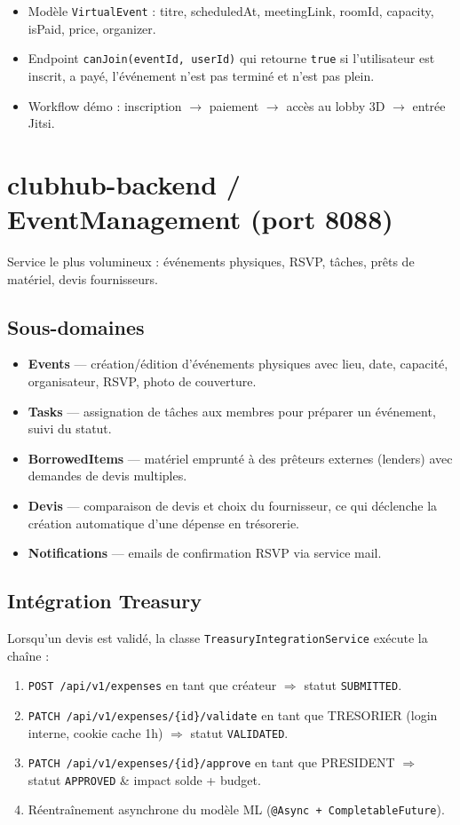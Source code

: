 \documentclass[11pt,a4paper]{report}
\begin{document}
\begin{itemize}
  \item Modèle \texttt{VirtualEvent} : titre, scheduledAt, meetingLink, roomId,
        capacity, isPaid, price, organizer.
  \item Endpoint \texttt{canJoin(eventId, userId)} qui retourne \texttt{true}
        si l'utilisateur est inscrit, a payé, l'événement n'est pas terminé et
        n'est pas plein.
  \item Workflow démo : inscription \(\rightarrow\) paiement \(\rightarrow\)
        accès au lobby 3D \(\rightarrow\) entrée Jitsi.
\end{itemize}

\section{clubhub-backend / EventManagement (port 8088)}

Service le plus volumineux : événements physiques, RSVP, tâches, prêts de
matériel, devis fournisseurs.

\subsection{Sous-domaines}
\begin{itemize}
  \item \textbf{Events} — création/édition d'événements physiques avec lieu,
        date, capacité, organisateur, RSVP, photo de couverture.
  \item \textbf{Tasks} — assignation de tâches aux membres pour préparer un
        événement, suivi du statut.
  \item \textbf{BorrowedItems} — matériel emprunté à des prêteurs externes
        (lenders) avec demandes de devis multiples.
  \item \textbf{Devis} — comparaison de devis et choix du fournisseur, ce qui
        déclenche la création automatique d'une dépense en trésorerie.
  \item \textbf{Notifications} — emails de confirmation RSVP via service mail.
\end{itemize}

\subsection{Intégration Treasury}
Lorsqu'un devis est validé, la classe \texttt{TreasuryIntegrationService}
exécute la chaîne :
\begin{enumerate}
  \item \texttt{POST /api/v1/expenses} en tant que créateur \(\Rightarrow\)
        statut \texttt{SUBMITTED}.
  \item \texttt{PATCH /api/v1/expenses/\{id\}/validate} en tant que TRESORIER
        (login interne, cookie cache 1h) \(\Rightarrow\) statut \texttt{VALIDATED}.
  \item \texttt{PATCH /api/v1/expenses/\{id\}/approve} en tant que PRESIDENT
        \(\Rightarrow\) statut \texttt{APPROVED} \& impact solde + budget.
  \item Réentraînement asynchrone du modèle ML (\texttt{@Async +
        CompletableFuture}).
\end{enumerate}
\end{document}
